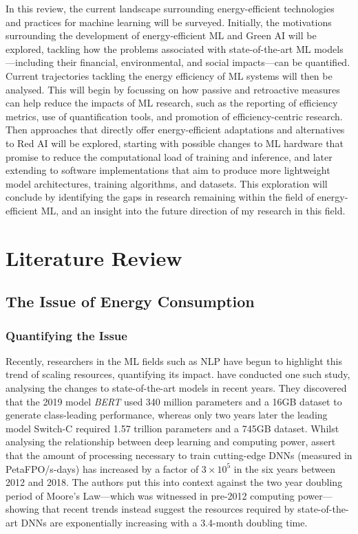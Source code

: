 \documentclass[a4paper, 12pt]{article}
\begin{document}
    In this review, the current landscape surrounding energy-efficient technologies and practices for machine learning will be surveyed. Initially, the motivations surrounding the development of energy-efficient ML and Green AI will be explored, tackling how the problems associated with state-of-the-art ML models---including their financial, environmental, and social impacts---can be quantified. Current trajectories tackling the energy efficiency of ML systems will then be analysed. This will begin by focussing on how passive and retroactive measures can help reduce the impacts of ML research, such as the reporting of efficiency metrics, use of quantification tools, and promotion of efficiency-centric research. Then approaches that directly offer energy-efficient adaptations and alternatives to Red AI will be explored, starting with possible changes to ML hardware that promise to reduce the computational load of training and inference, and later extending to software implementations that aim to produce more lightweight model architectures, training algorithms, and datasets. This exploration will conclude by identifying the gaps in research remaining within the field of energy-efficient ML, and an insight into the future direction of my research in this field.

    \section{Literature Review}

    \subsection{The Issue of Energy Consumption}

    \subsubsection{Quantifying the Issue}

    Recently, researchers in the ML fields such as NLP have begun to highlight this trend of scaling resources, quantifying its impact.  have conducted one such study, analysing the changes to state-of-the-art models in recent years. They discovered that the 2019 model \emph{BERT} \cite{devlin-2019} used 340 million parameters and a 16GB dataset to generate class-leading performance, whereas only two years later the leading model Switch-C \cite{fedus-2021} required 1.57 trillion parameters and a 745GB dataset. Whilst analysing the relationship between deep learning and computing power,  assert that the amount of processing necessary to train cutting-edge DNNs (measured in PetaFPO/s-days) has increased by a factor of $3 \times 10^5$ in the six years between 2012 and 2018. The authors put this into context against the two year doubling period of Moore's Law---which was witnessed in pre-2012 computing power---showing that recent trends instead suggest the resources required by state-of-the-art DNNs are exponentially increasing with a 3.4-month doubling time.
\end{document}

